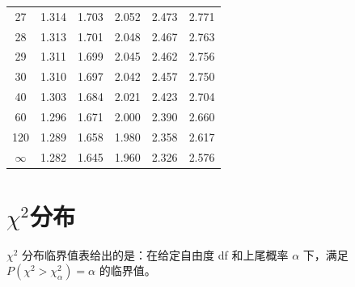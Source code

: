 \documentclass[lang=cn,10pt]{elegantbook}
\begin{document}
\begin{table}[H]
\begin{tabular}{c|ccccc}
    27 & 1.314 & 1.703 & 2.052 & 2.473 & 2.771 \\
    28 & 1.313 & 1.701 & 2.048 & 2.467 & 2.763 \\
    29 & 1.311 & 1.699 & 2.045 & 2.462 & 2.756 \\
    30 & 1.310 & 1.697 & 2.042 & 2.457 & 2.750 \\
    40 & 1.303 & 1.684 & 2.021 & 2.423 & 2.704 \\
    60 & 1.296 & 1.671 & 2.000 & 2.390 & 2.660 \\
    120 & 1.289 & 1.658 & 1.980 & 2.358 & 2.617 \\
    $\infty$ & 1.282 & 1.645 & 1.960 & 2.326 & 2.576 \\
    \bottomrule
  \end{tabular}
\end{table}

\section{$\chi^2$分布}
$\chi^2$ 分布临界值表给出的是：在给定自由度 df 和上尾概率 $\alpha$ 下，满足 $P(\chi^2>\chi^2_{\alpha})=\alpha$ 的临界值。
\end{document}
